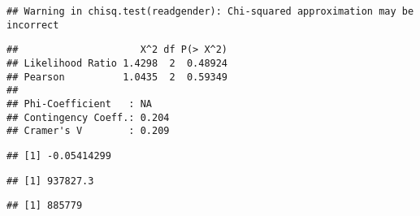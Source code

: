 \documentclass[]{article}
\newenvironment{Shaded}{\begin{snugshade}}{\end{snugshade}}
\newcommand{\CommentTok}[1]{\textcolor[rgb]{0.56,0.35,0.01}{\textit{#1}}}
\newcommand{\DataTypeTok}[1]{\textcolor[rgb]{0.13,0.29,0.53}{#1}}
\newcommand{\KeywordTok}[1]{\textcolor[rgb]{0.13,0.29,0.53}{\textbf{#1}}}
\newcommand{\NormalTok}[1]{#1}
\newcommand{\OperatorTok}[1]{\textcolor[rgb]{0.81,0.36,0.00}{\textbf{#1}}}
\newcommand{\StringTok}[1]{\textcolor[rgb]{0.31,0.60,0.02}{#1}}
\begin{document}
\begin{verbatim}
## Warning in chisq.test(readgender): Chi-squared approximation may be incorrect
\end{verbatim}

\begin{verbatim}
##                     X^2 df P(> X^2)
## Likelihood Ratio 1.4298  2  0.48924
## Pearson          1.0435  2  0.59349
## 
## Phi-Coefficient   : NA 
## Contingency Coeff.: 0.204 
## Cramer's V        : 0.209
\end{verbatim}

\begin{Shaded}
\end{Shaded}

\begin{verbatim}
## [1] -0.05414299
\end{verbatim}

\begin{Shaded}
\end{Shaded}

\begin{verbatim}
## [1] 937827.3
\end{verbatim}

\begin{Shaded}
\end{Shaded}

\begin{verbatim}
## [1] 885779
\end{verbatim}

\begin{Shaded}
\end{Shaded}
\end{document}
